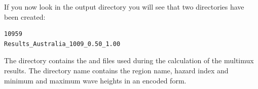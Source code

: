 \documentclass{manual}
\begin{document}
\begin{figure}[ht]
  \centerline{}
  \label{fig:event5}
\end{figure}

If you now look in the output directory  you will see that two directories have been created:

\begin{verbatim}
10959
Results_Australia_1009_0.50_1.00
\end{verbatim}

The  directory contains the  and 
files used during the calculation of the multimux results.  The  directory name contains the 
region name, hazard index and minimum and maximum wave heights in an encoded form.
\end{document}
